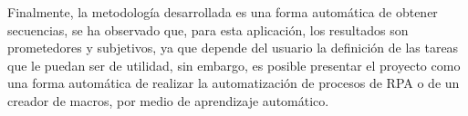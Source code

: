 Finalmente, la metodolog\'ia desarrollada es una forma autom\'atica de obtener 
 secuencias, se ha observado que, para esta aplicaci\'on, los resultados son 
 prometedores y subjetivos, ya que depende del usuario la definici\'on de las 
 tareas que le puedan ser de utilidad, sin embargo, es posible presentar el 
 proyecto como una forma autom\'atica de realizar la automatizaci\'on de 
 procesos de RPA o de un creador de macros, por medio de aprendizaje 
 autom\'atico.
